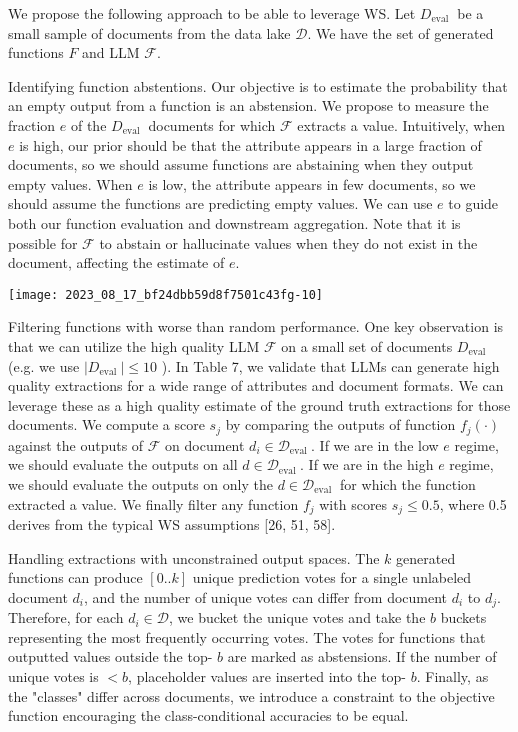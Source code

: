 \documentclass[10pt]{article}
\begin{document}
We propose the following approach to be able to leverage WS. Let $D_{\text {eval }}$ be a small sample of documents from the data lake $\mathcal{D}$. We have the set of generated functions $F$ and LLM $\mathcal{F}$.

Identifying function abstentions. Our objective is to estimate the probability that an empty output from a function is an abstension. We propose to measure the fraction $e$ of the $D_{\text {eval }}$ documents for which $\mathcal{F}$ extracts a value. Intuitively, when $e$ is high, our prior should be that the attribute appears in a large fraction of documents, so we should assume functions are abstaining when they output empty values. When $e$ is low, the attribute appears in few documents, so we should assume the functions are predicting empty values. We can use $e$ to guide both our function evaluation and downstream aggregation. Note that it is possible for $\mathcal{F}$ to abstain or hallucinate values when they do not exist in the document, affecting the estimate of $e$.

\begin{center}
\texttt{[image: 2023\_08\_17\_bf24dbb59d8f7501c43fg-10]}
\end{center}

Filtering functions with worse than random performance. One key observation is that we can utilize the high quality LLM $\mathcal{F}$ on a small set of documents $D_{\text {eval }}$ (e.g. we use $\left|D_{\text {eval }}\right| \leq 10$ ). In Table 7, we validate that LLMs can generate high quality extractions for a wide range of attributes and document formats. We can leverage these as a high quality estimate of the ground truth extractions for those documents. We compute a score $s_{j}$ by comparing the outputs of function $f_{j}(\cdot)$ against the outputs of $\mathcal{F}$ on document $d_{i} \in \mathcal{D}_{\text {eval }}$. If we are in the low $e$ regime, we should evaluate the outputs on all $d \in \mathcal{D}_{\text {eval }}$. If we are in the high $e$ regime, we should evaluate the outputs on only the $d \in \mathcal{D}_{\text {eval }}$ for which the function extracted a value. We finally filter any function $f_{j}$ with scores $s_{j} \leq 0.5$, where 0.5 derives from the typical WS assumptions [26, 51, 58].

Handling extractions with unconstrained output spaces. The $k$ generated functions can produce $[0 . . k]$ unique prediction votes for a single unlabeled document $d_{i}$, and the number of unique votes can differ from document $d_{i}$ to $d_{j}$. Therefore, for each $d_{i} \in \mathcal{D}$, we bucket the unique votes and take the $b$ buckets representing the most frequently occurring votes. The votes for functions that outputted values outside the top- $b$ are marked as abstensions. If the number of unique votes is $<b$, placeholder values are inserted into the top- $b$. Finally, as the "classes" differ across documents, we introduce a constraint to the objective function encouraging the class-conditional accuracies to be equal.
\end{document}
